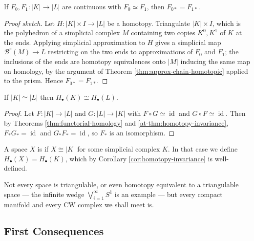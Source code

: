 \documentclass[a4paper]{scrartcl}
\newcommand{\id}{\operatorname{id}}
\newcommand{\bary}{\mathcal{B}}
\begin{document}
\begin{theorem} \label{at-thm:homotopy-invariance}
	If $F_0, F_1: |K|\to|L|$ are continuous with $F_0 \simeq F_1$, then $F_{0*} = F_{1*}$.
\end{theorem}
\begin{proof}[Proof sketch]
	Let $H: |K|\times I \to |L|$ be a homotopy. Triangulate $|K|\times I$, which is the polyhedron of a simplicial complex $M$ containing two copies $K^0, K^1$ of $K$ at the ends. Applying simplicial approximation to $H$ gives a simplicial map $\bary^r(M)\to L$ restricting on the two ends to approximations of $F_0$ and $F_1$; the inclusions of the ends are homotopy equivalences onto $|M|$ inducing the same map on homology, by the argument of Theorem \ref{thm:approx-chain-homotopic} applied to the prism. Hence $F_{0*} = F_{1*}$.
\end{proof}

\begin{corollary} \label{cor:homotopy-invariance}
	If $|K| \simeq |L|$ then $H_\bullet(K)\cong H_\bullet(L)$.
\end{corollary}
\begin{proof}
	Let $F: |K|\to|L|$ and $G: |L|\to|K|$ with $F\circ G \simeq \id$ and $G \circ F \simeq \id$. Then by Theorems \ref{thm:functorial-homology} and \ref{at-thm:homotopy-invariance}, $F_*G_* = \id$ and $G_*F_* = \id$, so $F_*$ is an isomorphism.
\end{proof}

\begin{definition}
	A space $X$ is  if $X \cong |K|$ for some simplicial complex $K$. In that case we define $H_\bullet(X) = H_\bullet(K)$, which by Corollary \ref{cor:homotopy-invariance} is well-defined.
\end{definition}

Not every space is triangulable, or even homotopy equivalent to a triangulable space --- the
infinite wedge $\bigvee_{i=1}^\infty S^1$ is an example --- but every compact manifold and
every CW complex we shall meet is.

\subsection{First Consequences}
\end{document}
